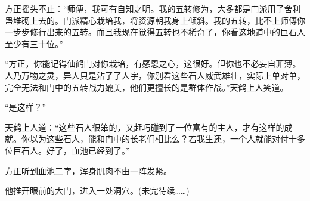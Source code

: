 \begin{this_body}
方正摇头不止：“师傅，我可有自知之明。我的五转修为，大多都是门派用了舍利蛊堆砌上去的。门派精心栽培我，将资源朝我身上倾斜。我的五转，比不上师傅你一步步修行出来的五转。而且我现在觉得五转也不稀奇了，你看这地道中的巨石人至少有三十位。”

“方正，你能记得仙鹤门对你栽培，有感恩之心，这很好。但你也不必妄自菲薄。人乃万物之灵，异人只是沾了了人字，你别看这些石人威武雄壮，实际上单对单，完全无法和门中的五转战力媲美，他们更擅长的是群体作战。”天鹤上人笑道。

“是这样？”

天鹤上人道：“这些石人很笨的，又赶巧碰到了一位富有的主人，才有这样的成就。你以为这些石人，能和门中的长老们相比么？若我生还，一个人就能对付十多位巨石人。好了，血池已经到了。”

方正听到血池二字，浑身肌肉不由一阵发紧。

他推开眼前的大门，进入一处洞穴。(未完待续……)

\end{this_body}

